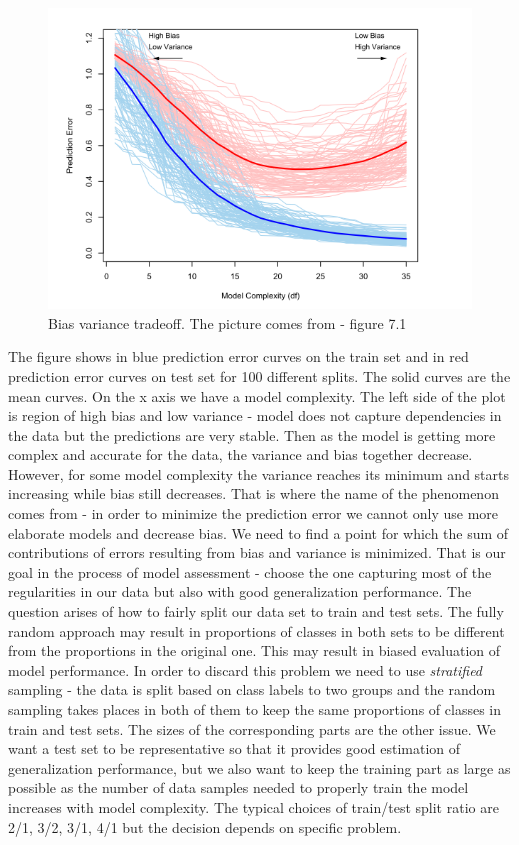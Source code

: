 \documentclass[shortabstract, english, mgr]{iithesis}
\begin{document}
\begin{figure}
\centering
\includegraphics[width=\textwidth]{images/BiasVarianceTrade.png}
\caption{Bias variance tradeoff. The picture comes from \cite{ESL2} - figure 7.1}
\label{fig:biasVarTrade}
\end{figure}

The figure shows in blue prediction error curves on the train set and in red prediction error curves on test set for 100 different splits. The solid curves are the mean curves. On the x axis we have a model complexity. The left side of the plot is region of high bias and low variance - model does not capture dependencies in the data but the predictions are very stable. Then as the model is getting more complex and accurate for the data, the variance and bias together decrease. However, for some model complexity the variance reaches its minimum and starts increasing while bias still decreases. That is where the name of the phenomenon comes from - in order to minimize the prediction error we cannot only use more elaborate models and decrease bias. We need to find a point for which the sum of contributions of errors resulting from bias and variance is minimized. That is our goal in the process of model assessment - choose the one capturing most of the regularities in our data but also with good generalization performance. The question arises of how to fairly split our data set to train and test sets. The fully random approach may result in proportions of classes in both sets to be different from the proportions in the original one. This may result in biased evaluation of model performance. In order to discard this problem we need to use \textit{stratified} sampling - the data is split based on class labels to two groups and the random sampling takes places in both of them to keep the same proportions of classes in train and test sets. The sizes of the corresponding parts are the other issue. We want a test set to be representative so that it provides good estimation of generalization performance, but we also want to keep the training part as large as possible as the number of data samples needed to properly train the model increases with model complexity.  The typical choices of train/test split ratio are 2/1, 3/2, 3/1, 4/1 but the decision depends on specific problem.  
\end{document}
